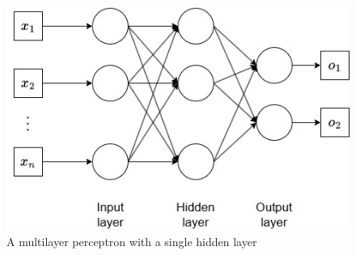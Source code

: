 		\begin{figure}[H]
			\centering
			\includegraphics[width=0.7\linewidth]{img/img-multilayer-perceptron}
			\caption{A multilayer perceptron with a single hidden layer}
			\label{fig:img-multilayer-perceptron}
		\end{figure}
		
		
		
